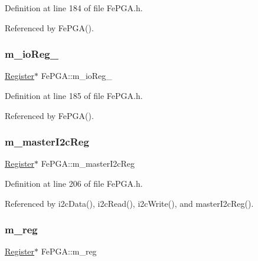 Definition at line 184 of file Fe\+P\+G\+A.\+h.



Referenced by Fe\+P\+G\+A().

\mbox{\label{classFePGA_a634d74bc7104816d7ef1bbe816bdf366}} 
\subsubsection{\texorpdfstring{m\+\_\+io\+Reg\+\_}{m\_ioReg\_3}}
{\footnotesize\ttfamily \hyperlink{classRegister}{Register}$\ast$ Fe\+P\+G\+A\+::m\+\_\+io\+Reg\+\_\hspace{0.3cm}{\ttfamily [private]}}



Definition at line 185 of file Fe\+P\+G\+A.\+h.



Referenced by Fe\+P\+G\+A().

\mbox{\label{classFePGA_adb390ea8de4a6cbce648dc62e4405f32}} 
\subsubsection{\texorpdfstring{m\+\_\+master\+I2c\+Reg}{m\_masterI2cReg}}
{\footnotesize\ttfamily \hyperlink{classRegister}{Register}$\ast$ Fe\+P\+G\+A\+::m\+\_\+master\+I2c\+Reg\hspace{0.3cm}{\ttfamily [private]}}



Definition at line 206 of file Fe\+P\+G\+A.\+h.



Referenced by i2c\+Data(), i2c\+Read(), i2c\+Write(), and master\+I2c\+Reg().

\mbox{\label{classFePGA_afdbe1ea67182ffdaaf62116d66839ad7}} 
\subsubsection{\texorpdfstring{m\+\_\+reg}{m\_reg}}
{\footnotesize\ttfamily \hyperlink{classRegister}{Register}$\ast$ Fe\+P\+G\+A\+::m\+\_\+reg\hspace{0.3cm}{\ttfamily [private]}}



